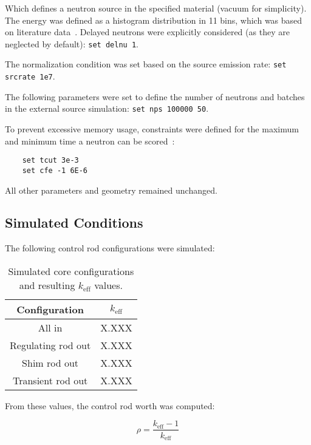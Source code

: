 Which defines a neutron source in the specified material (vacuum for simplicity).
The energy was defined as a histogram distribution in 11 bins, which was based on literature data~\cite{Geiger1964}.
Delayed neutrons were explicitly considered (as they are neglected by default): \texttt{set delnu 1}.

The normalization condition was set based on the source emission rate: \texttt{set srcrate 1e7}.

The following parameters were set to define the number of neutrons and batches in the external source simulation: \texttt{set nps 100000 50}.

To prevent excessive memory usage, constraints were defined for the maximum and minimum time a neutron can be scored~\cite{SerpentMC2013}:

\begin{lstlisting}
    set tcut 3e-3
    set cfe -1 6E-6
\end{lstlisting}

All other parameters and geometry remained unchanged.

\subsection{Simulated Conditions}

The following control rod configurations were simulated:

\begin{table}[H]
    \centering
    \begin{tabular}{|c|c|}
        \hline
        \textbf{Configuration} & \textbf{\( k_{\text{eff}} \)} \\
        \hline
        All in & X.XXX \\
        Regulating rod out & X.XXX \\
        Shim rod out & X.XXX \\
        Transient rod out & X.XXX \\
        \hline
    \end{tabular}
    \caption{Simulated core configurations and resulting $ k_{\text{eff}} $ values.}
    \label{tab:keff_values}
\end{table}

From these values, the control rod worth was computed:

\begin{equation}
\rho = \frac{k_{\text{eff}} - 1}{k_{\text{eff}}}
\end{equation}

